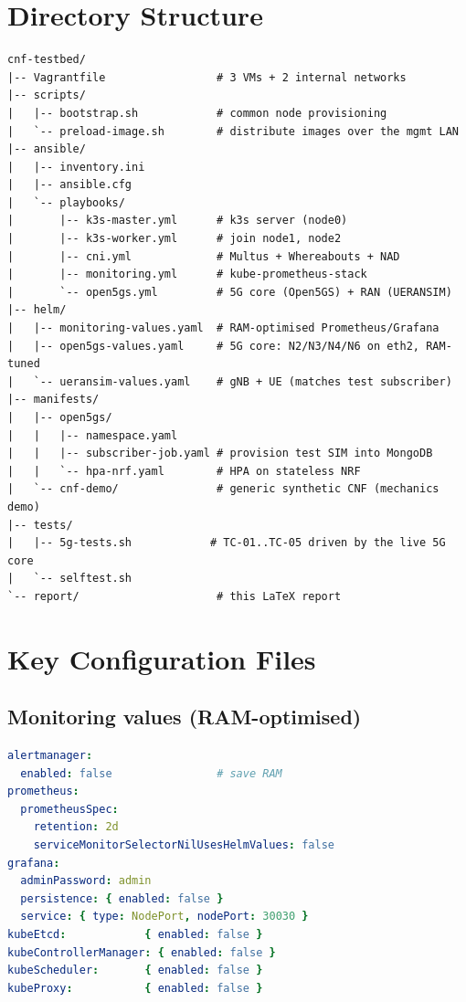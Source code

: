 \section{Directory Structure}

\begin{lstlisting}[caption=Project directory layout]
cnf-testbed/
|-- Vagrantfile                 # 3 VMs + 2 internal networks
|-- scripts/
|   |-- bootstrap.sh            # common node provisioning
|   `-- preload-image.sh        # distribute images over the mgmt LAN
|-- ansible/
|   |-- inventory.ini
|   |-- ansible.cfg
|   `-- playbooks/
|       |-- k3s-master.yml      # k3s server (node0)
|       |-- k3s-worker.yml      # join node1, node2
|       |-- cni.yml             # Multus + Whereabouts + NAD
|       |-- monitoring.yml      # kube-prometheus-stack
|       `-- open5gs.yml         # 5G core (Open5GS) + RAN (UERANSIM)
|-- helm/
|   |-- monitoring-values.yaml  # RAM-optimised Prometheus/Grafana
|   |-- open5gs-values.yaml     # 5G core: N2/N3/N4/N6 on eth2, RAM-tuned
|   `-- ueransim-values.yaml    # gNB + UE (matches test subscriber)
|-- manifests/
|   |-- open5gs/
|   |   |-- namespace.yaml
|   |   |-- subscriber-job.yaml # provision test SIM into MongoDB
|   |   `-- hpa-nrf.yaml        # HPA on stateless NRF
|   `-- cnf-demo/               # generic synthetic CNF (mechanics demo)
|-- tests/
|   |-- 5g-tests.sh            # TC-01..TC-05 driven by the live 5G core
|   `-- selftest.sh
`-- report/                     # this LaTeX report
\end{lstlisting}

\section{Key Configuration Files}

\subsection{Monitoring values (RAM-optimised)}

\begin{lstlisting}[language=yaml, caption=helm/monitoring-values.yaml (excerpt)]
alertmanager:
  enabled: false                # save RAM
prometheus:
  prometheusSpec:
    retention: 2d
    serviceMonitorSelectorNilUsesHelmValues: false
grafana:
  adminPassword: admin
  persistence: { enabled: false }
  service: { type: NodePort, nodePort: 30030 }
kubeEtcd:            { enabled: false }
kubeControllerManager: { enabled: false }
kubeScheduler:       { enabled: false }
kubeProxy:           { enabled: false }
\end{lstlisting}

